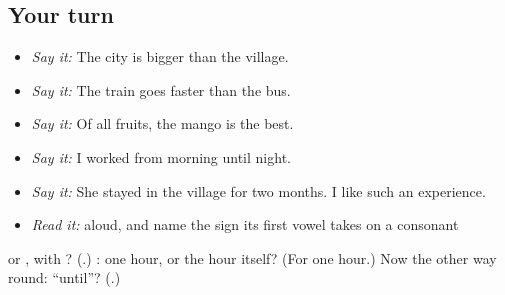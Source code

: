 \subsection*{Your turn}
\begin{itemize}
\raggedright
  \item \emph{Say it:} The city is bigger than the village.
  \item \emph{Say it:} The train goes faster than the bus.
  \item \emph{Say it:} Of all fruits, the mango is the best.
  \item \emph{Say it:} I worked from morning until night.
  \item \emph{Say it:} She stayed in the village for two months. I like such an experience.
  \item \emph{Read it:} \textbf{} aloud, and name the sign its first vowel takes on a consonant
\end{itemize}

\begin{tcolorbox}[breakable,colback=teal!4,colframe=teal!35!black,title={Before you move on}]
\textbf{} or \textbf{}, with \textbf{}? (\textbf{}.) \textbf{ }: one hour, or the hour itself? (For one hour.) Now the other way round: \textquotedblleft{}until\textquotedblright{}? (\textbf{}.)
\end{tcolorbox}
